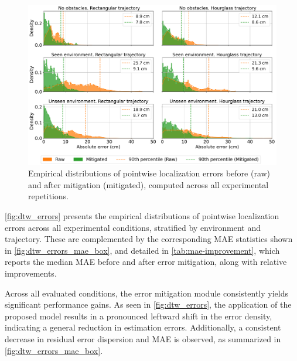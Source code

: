 \begin{figure}[tbh]
    \centering
    \includegraphics[width=\textwidth]{Figures/experiments_and_results/dtw_errors.pdf}
    \caption[Empirical distributions of localization errors before and after mitigation.]{Empirical distributions of pointwise localization errors before (raw) and after mitigation (mitigated), computed across all experimental repetitions.}
    \label{fig:dtw_errors}
\end{figure}

\autoref{fig:dtw_errors} presents the empirical distributions of pointwise localization errors across all experimental conditions, stratified by environment and trajectory. These are complemented by the corresponding MAE statistics shown in \autoref{fig:dtw_errors_mae_box}, and detailed in \autoref{tab:mae-improvement}, which reports the median MAE before and after error mitigation, along with relative improvements.

Across all evaluated conditions, the error mitigation module consistently yields significant performance gains. As seen in \autoref{fig:dtw_errors}, the application of the proposed model results in a pronounced leftward shift in the error density, indicating a general reduction in estimation errors. Additionally, a consistent decrease in residual error dispersion and MAE is observed, as summarized in \autoref{fig:dtw_errors_mae_box}.

